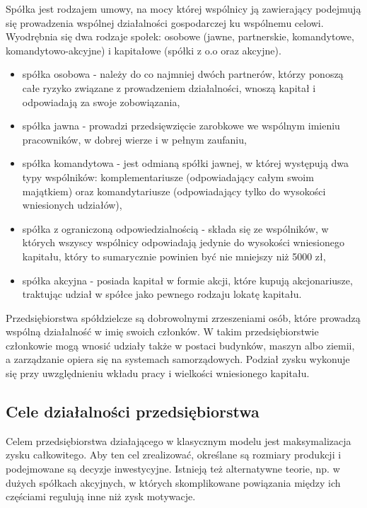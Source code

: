 \documentclass[12pt]{extarticle}
\begin{document}
Spółka jest rodzajem umowy, na mocy której wspólnicy ją zawierający podejmują się prowadzenia wspólnej działalności gospodarczej ku wspólnemu celowi. Wyodrębnia się dwa rodzaje społek: osobowe (jawne, partnerskie, komandytowe, komandytowo-akcyjne) i kapitałowe (spółki z o.o oraz akcyjne).

\begin{itemize}
	\item spółka osobowa - należy do co najmniej dwóch partnerów, którzy ponoszą całe ryzyko związane z prowadzeniem działalności, wnoszą kapitał i odpowiadają za swoje zobowiązania,
    \item spółka jawna - prowadzi przedsięwzięcie zarobkowe we wspólnym imieniu pracowników, w dobrej wierze i w pełnym zaufaniu,
    \item spółka komandytowa - jest odmianą spółki jawnej, w której występują dwa typy wspólników: komplementariusze (odpowiadający całym swoim majątkiem) oraz komandytariusze (odpowiadający tylko do wysokości wniesionych udziałów),
    \item spółka z ograniczoną odpowiedzialnością - składa się ze wspólników, w których wszyscy wspólnicy odpowiadają jedynie do wysokości wniesionego kapitału, który to sumarycznie powinien być nie mniejszy niż 5000 zł,
    \item spółka akcyjna - posiada kapitał w formie akcji, które kupują akcjonariusze, traktując udział w spółce jako pewnego rodzaju lokatę kapitału.
\end{itemize}


Przedsiębiorstwa spółdzielcze są dobrowolnymi zrzeszeniami osób, które prowadzą wspólną działalność w imię swoich członków. W takim przedsiębiorstwie członkowie mogą wnosić udziały także w postaci budynków, maszyn albo ziemii, a zarządzanie opiera się na systemach samorządowych. Podział zysku wykonuje się przy uwzględnieniu wkładu pracy i wielkości wniesionego kapitału.

\subsection{Cele działalności przedsiębiorstwa}

Celem przedsiębiorstwa działającego w klasycznym modelu jest maksymalizacja zysku całkowitego. Aby ten cel zrealizować, określane są rozmiary produkcji i podejmowane są decyzje inwestycyjne. Istnieją też alternatywne teorie, np. w dużych spółkach akcyjnych, w których skomplikowane powiązania między ich częściami regulują inne niż zysk motywacje. 
\end{document}
